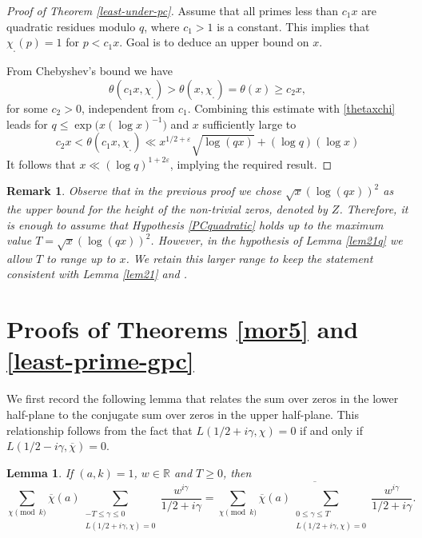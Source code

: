 \documentclass[pdflatex]{sn-jnl}%
\newcommand{\eps}{\ensuremath{\varepsilon}}
\theoremstyle{sltheorems}
\newtheorem{lem}{Lemma}
\theoremstyle{plainrem}
\newtheorem{Rem}{Remark}
\theoremstyle{definition}
\begin{document}
\begin{proof}[Proof of Theorem \ref{least-under-pc}]
Assume that all primes less than $c_1 x$ are quadratic residues modulo $q$, where $c_1>1$ is a  constant.
This implies that $\chi_{_\square}(p) = 1$
for $p < c_1 x$.
Goal is to deduce an upper bound on $x$.

From Chebyshev's bound we have
\[
\theta(c_1 x, \chi_{_\square}) > \theta(x,\chi_{_\square}) = \theta(x) \ge c_2 x,
\]
for some $c_2>0$, independent from $c_1$.
%
Combining this estimate with \eqref{thetaxchi} leads for $q \le \exp\bigl( x(\log x)^{-1} \bigr)$ and $x$ sufficiently large to
$$
c_2 x < \theta(c_1 x, \chi_{_\square}) \ll
x^{1/2+\eps} \sqrt{\log (qx)} + (\log q) (\log x)$$
It follows that $ x \ll (\log q)^{1+2\eps}$, implying the required result.
\end{proof}

\begin{Rem}
 Observe that in the previous proof we chose $\sqrt{x} (\log (qx))^2$ as the upper bound for the height of the non-trivial zeros, denoted by $Z$. Therefore, it is enough to assume that  Hypothesis \ref{PCquadratic} holds up to the maximum value $T = \sqrt{x} (\log (qx))^2$. However, in the hypothesis of Lemma \ref{lem21q} we allow $T$ to range up to $x$. We retain this larger range to keep the statement consistent with Lemma \ref{lem21} and \cite[Lemma 9]{mathannalen}.
\end{Rem}


\section{Proofs of Theorems \ref{mor5} and \ref{least-prime-gpc}}

We first record the following lemma that relates the sum over zeros in the lower half-plane to the conjugate sum over zeros in the upper half-plane. This relationship follows from the fact that $L(1/2 + i\gamma, \chi) = 0$ if and only if $L(1/2 - i\gamma, \overline{\chi}) = 0$.


\begin{lem}\label{conj-trick-lemma}\cite[Lemma\,8]{mathannalen}
If $(a, k)= 1$, $w\in \mathbb{R}$ and $T\ge0$, then
\[
\sum_{\chi \pmod{k}}\overline{\chi}(a) \sum_{\substack{-T \le  \gamma \le  0
\\L(1/2 + i\gamma, \chi) = 0
}} \frac{w^{i\gamma}}{1/2 + i\gamma} 
=
\overline{
    \sum_{\chi \pmod{k}}
  \overline{\chi}(a) \!\!\! 
   \sum_{\substack{0\le  \gamma \le  T 
 \\ L(1/2+i\gamma,\chi)= 0
   }} 
\frac{w^{i\gamma}}{1/2 + i\gamma}}.
\] 
\end{lem}
\end{document}
